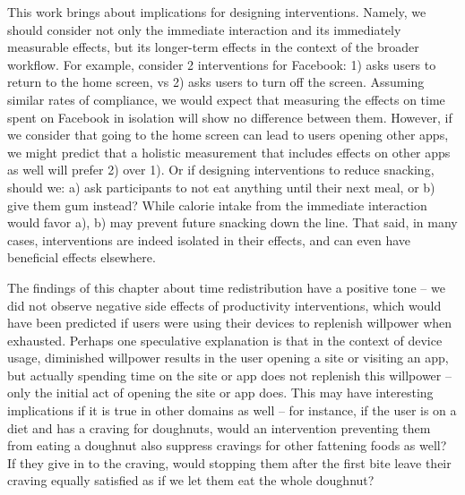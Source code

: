 This work brings about implications for designing interventions. Namely, we should consider not only the immediate interaction and its immediately measurable effects, but its longer-term effects in the context of the broader workflow. For example, consider 2 interventions for Facebook: 1) asks users to return to the home screen, vs 2) asks users to turn off the screen. Assuming similar rates of compliance, we would expect that measuring the effects on time spent on Facebook in isolation will show no difference between them. However, if we consider that going to the home screen can lead to users opening other apps, we might predict that a holistic measurement that includes effects on other apps as well will prefer 2) over 1).
Or if designing interventions to reduce snacking, should we: a) ask participants to not eat anything until their next meal, or b) give them gum instead? While calorie intake from the immediate interaction would favor a), b) may prevent future snacking down the line.
That said, in many cases, interventions are indeed isolated in their effects, and can even have beneficial effects elsewhere. %

The findings of this chapter about time redistribution have a positive tone -- we did not observe negative side effects of productivity interventions, which would have been predicted if users were using their devices to replenish willpower when exhausted. Perhaps one speculative explanation is that in the context of device usage, diminished willpower results in the user opening a site or visiting an app, but actually spending time on the site or app does not replenish this willpower -- only the initial act of opening the site or app does. This may have interesting implications if it is true in other domains as well -- for instance, if the user is on a diet and has a craving for doughnuts, would an intervention preventing them from eating a doughnut also suppress cravings for other fattening foods as well? If they give in to the craving, would stopping them after the first bite leave their craving equally satisfied as if we let them eat the whole doughnut?



